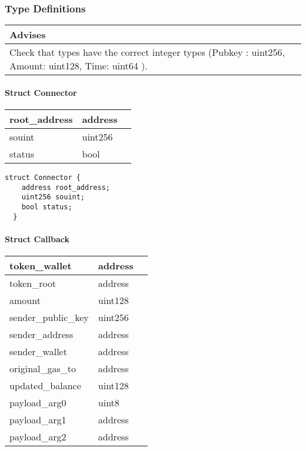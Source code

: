 \subsubsection{Type Definitions}


\ifsoldraft
\noindent\begin{tabular}{|p{12cm}|}\hline
\rowcolor{green}Advises
\\\hline
Check that types have the correct integer types (Pubkey : uint256, Amount: uint128, Time: uint64 ).
\\\hline\end{tabular}
\fi

\paragraph{Struct Connector}


\ifsoltables
\noindent\begin{tabular}{|l|l|p{6cm}|}\hline
root\_{}address & address & \\\hline
souint & uint256 & \\\hline
status & bool & \\\hline
\end{tabular}
\fi


\begin{lstlisting}[firstnumber=29]
  struct Connector {
    address root_address;
    uint256 souint;
    bool status;
  }
\end{lstlisting}

\paragraph{Struct Callback}


\ifsoltables
\noindent\begin{tabular}{|l|l|p{6cm}|}\hline
token\_{}wallet & address & \\\hline
token\_{}root & address & \\\hline
amount & uint128 & \\\hline
sender\_{}public\_{}key & uint256 & \\\hline
sender\_{}address & address & \\\hline
sender\_{}wallet & address & \\\hline
original\_{}gas\_{}to & address & \\\hline
updated\_{}balance & uint128 & \\\hline
payload\_{}arg0 & uint8 & \\\hline
payload\_{}arg1 & address & \\\hline
payload\_{}arg2 & address & \\\hline
\end{tabular}
\fi


